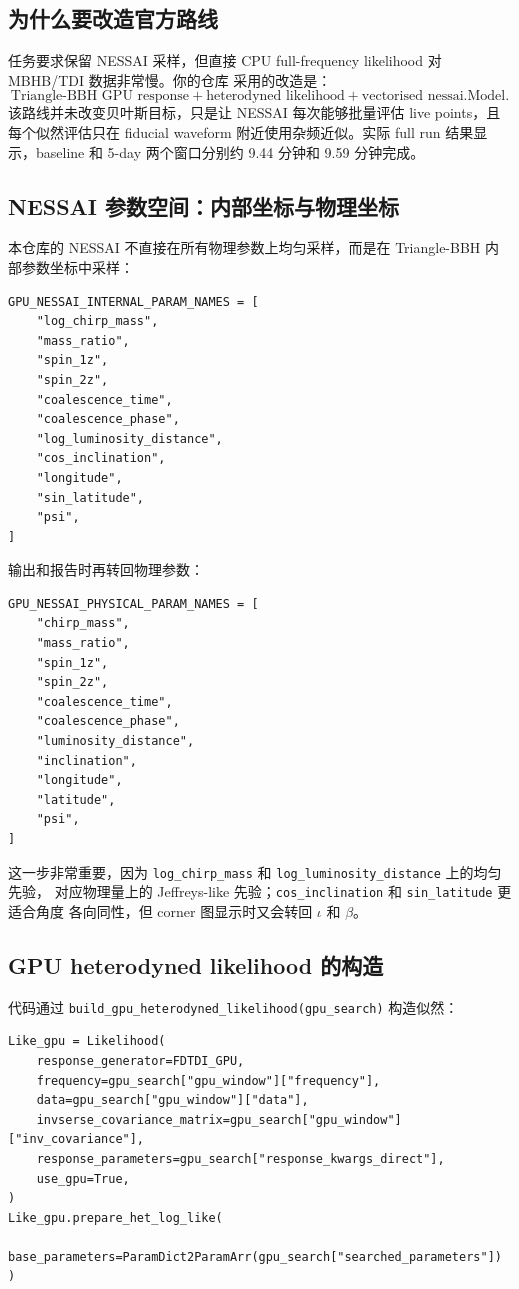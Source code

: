 \documentclass[11pt,a4paper]{ctexart}
\begin{document}
\subsection{为什么要改造官方路线}

任务要求保留 NESSAI 采样，但直接 CPU full-frequency likelihood 对 MBHB/TDI 数据非常慢。你的仓库
采用的改造是：
\[
\text{Triangle-BBH GPU response}
+ \text{heterodyned likelihood}
+ \text{vectorised nessai.Model}.
\]
该路线并未改变贝叶斯目标，只是让 NESSAI 每次能够批量评估 live points，且每个似然评估只在 fiducial
waveform 附近使用杂频近似。实际 full run 结果显示，baseline 和 5-day 两个窗口分别约 9.44 分钟和
9.59 分钟完成。

\subsection{NESSAI 参数空间：内部坐标与物理坐标}

本仓库的 NESSAI 不直接在所有物理参数上均匀采样，而是在 Triangle-BBH 内部参数坐标中采样：
\begin{lstlisting}[style=pycode]
GPU_NESSAI_INTERNAL_PARAM_NAMES = [
    "log_chirp_mass",
    "mass_ratio",
    "spin_1z",
    "spin_2z",
    "coalescence_time",
    "coalescence_phase",
    "log_luminosity_distance",
    "cos_inclination",
    "longitude",
    "sin_latitude",
    "psi",
]
\end{lstlisting}

输出和报告时再转回物理参数：
\begin{lstlisting}[style=pycode]
GPU_NESSAI_PHYSICAL_PARAM_NAMES = [
    "chirp_mass",
    "mass_ratio",
    "spin_1z",
    "spin_2z",
    "coalescence_time",
    "coalescence_phase",
    "luminosity_distance",
    "inclination",
    "longitude",
    "latitude",
    "psi",
]
\end{lstlisting}

这一步非常重要，因为 \texttt{log\_chirp\_mass} 和 \texttt{log\_luminosity\_distance} 上的均匀先验，
对应物理量上的 Jeffreys-like 先验；\texttt{cos\_inclination} 和 \texttt{sin\_latitude} 更适合角度
各向同性，但 corner 图显示时又会转回 \(\iota\) 和 \(\beta\)。

\subsection{GPU heterodyned likelihood 的构造}

代码通过 \texttt{build\_gpu\_heterodyned\_likelihood(gpu\_search)} 构造似然：
\begin{lstlisting}[style=pycode]
Like_gpu = Likelihood(
    response_generator=FDTDI_GPU,
    frequency=gpu_search["gpu_window"]["frequency"],
    data=gpu_search["gpu_window"]["data"],
    invserse_covariance_matrix=gpu_search["gpu_window"]["inv_covariance"],
    response_parameters=gpu_search["response_kwargs_direct"],
    use_gpu=True,
)
Like_gpu.prepare_het_log_like(
    base_parameters=ParamDict2ParamArr(gpu_search["searched_parameters"])
)
\end{lstlisting}
\end{document}
